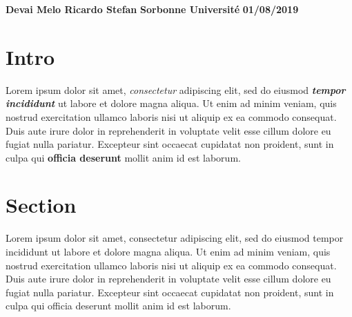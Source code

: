 \documentclass[12pt]{article}
\begin{document}
\begin{flushright}
\textbf{Devai Melo Ricardo Stefan}
\linebreak
\textbf{Sorbonne Université}
\linebreak
\textbf{01/08/2019}
\linebreak
\end{flushright}

\section*{Intro}
Lorem ipsum dolor sit amet, \emph{consectetur} adipiscing elit, sed do eiusmod \emph{\textbf{tempor incididunt}} ut labore et dolore magna aliqua. Ut enim ad minim veniam, quis nostrud exercitation ullamco laboris nisi ut aliquip ex ea commodo consequat. Duis aute irure dolor in reprehenderit in voluptate velit esse cillum dolore eu fugiat nulla pariatur. Excepteur sint occaecat cupidatat non proident, sunt in culpa qui \textbf{officia deserunt} mollit anim id est laborum.

\section*{Section}
Lorem ipsum dolor sit amet, consectetur adipiscing elit, sed do eiusmod tempor incididunt ut labore et dolore magna aliqua. Ut enim ad minim veniam, quis nostrud exercitation ullamco laboris nisi ut aliquip ex ea commodo consequat. Duis aute irure dolor in reprehenderit in voluptate velit esse cillum dolore eu fugiat nulla pariatur. Excepteur sint occaecat cupidatat non proident, sunt in culpa qui officia deserunt mollit anim id est laborum.
\end{document}
